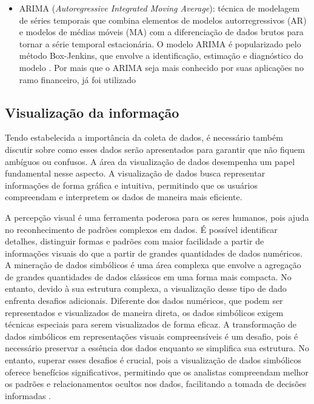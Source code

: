 \begin{itemize}
    \item ARIMA (\textit{Autoregressive Integrated Moving Average}): técnica de modelagem de séries temporais que combina elementos de modelos autorregressivos (AR) e modelos de médias móveis (MA) com a diferenciação de dados brutos para tornar a série temporal estacionária. O modelo ARIMA é popularizado pelo método Box-Jenkins, que envolve a identificação, estimação e diagnóstico do modelo \cite{Shumway2017}. Por mais que o ARIMA seja mais conhecido por suas aplicações no ramo financeiro, já foi utilizado 
\end{itemize}

\subsection{Visualização da informação}

Tendo estabelecida a importância da coleta de dados, é necessário também discutir sobre como esses dados serão apresentados para garantir que não fiquem ambíguos ou confusos. A área da visualização de dados desempenha um papel fundamental nesse aspecto. A visualização de dados busca representar informações de forma gráfica e intuitiva, permitindo que os usuários compreendam e interpretem os dados de maneira mais eficiente.

A percepção visual é uma ferramenta poderosa para os seres humanos, pois ajuda no reconhecimento de padrões complexos em dados. É possível identificar detalhes, distinguir formas e padrões com maior facilidade a partir de informações visuais do que a partir de grandes quantidades de dados numéricos. A mineração de dados simbólicos é uma área complexa que envolve a agregação de grandes quantidades de dados clássicos em uma forma mais compacta. No entanto, devido à sua estrutura complexa, a visualização desse tipo de dado enfrenta desafios adicionais. Diferente dos dados numéricos, que podem ser representados e visualizados de maneira direta, os dados simbólicos exigem técnicas especiais para serem visualizados de forma eficaz. A transformação de dados simbólicos em representações visuais compreensíveis é um desafio, pois é necessário preservar a essência dos dados enquanto se simplifica sua estrutura. No entanto, superar esses desafios é crucial, pois a visualização de dados simbólicos oferece benefícios significativos, permitindo que os analistas compreendam melhor os padrões e relacionamentos ocultos nos dados, facilitando a tomada de decisões informadas \cite{Umbleja2020}.

